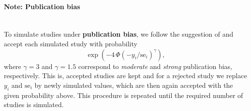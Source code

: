 \documentclass[letterpaper, 12pt]{article}
\newcommand{\N}{\mathcal{N}}
\begin{document}
%
%

\paragraph{Note: Publication bias}\mbox{}\\
To simulate studies under \textbf{publication bias}, we follow the suggestion
of \citet{henm:copa:10} and accept each simulated study with probability
\begin{equation} \label{eq:pbias}
\exp(-4\, \Phi(-y_i / \text{se}_i)^\gamma ),
\end{equation}
where $\gamma = 3$ and $\gamma = 1.5$ correspond to \emph{moderate} and
\emph{strong} publication bias, respectively.
This is, accepted studies are kept and for a rejected study we replace $y_i$
and $\text{se}_i$ by newly simulated values, which are then again accepted
with the given probability above. This procedure is repeated until the required
number of studies is simulated. 
\end{document}
